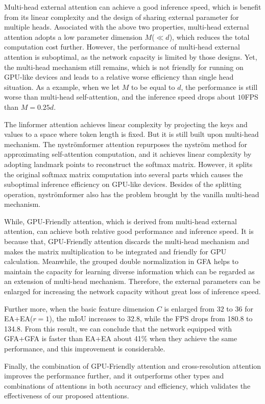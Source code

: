 \documentclass{article}
\begin{document}
Multi-head external attention can achieve a good inference speed, which is benefit from its linear complexity and the design of sharing external parameter for multiple heads. Associated with the above two properties, multi-head external attention adopts a low parameter dimension $M$($\ll d$), which reduces the total computation cost further. However, the performance of multi-head external attention is suboptimal, as the network capacity is limited by those designs. Yet, the multi-head mechanism still remains, which is not friendly for running on GPU-like devices and leads to a relative worse efficiency than single head situation. As a example, when we let $M$ to be equal to $d$, the performance is still worse than multi-head self-attention, and the inference speed drops about $10$FPS than $M = 0.25d$.

The linformer attention achieves linear complexity by projecting the keys and values to a space where token length is fixed. But it is still built upon multi-head mechanism. The nystr{\"o}mformer attention repurposes the nystr{\"o}m method for approximating self-attention computation, and it achieves linear complexity by adopting landmark points to reconstruct the softmax matrix. However, it splits the original softmax matrix computation into several parts which causes the suboptimal inference efficiency on GPU-like devices. Besides of the splitting operation, nystr{\"o}mformer also has the problem brought by the vanilla multi-head mechanism.

While, GPU-Friendly attention, which is derived from multi-head external attention, can achieve both relative good performance and inference speed. It is because that, GPU-Friendly attention discards the multi-head mechanism and makes the matrix multiplication to be integrated and friendly for GPU calculation. Meanwhile, the grouped double normalization in GFA helps to maintain the capacity for learning diverse information which can be regarded as an extension of multi-head mechanism. Therefore, the external parameters can be enlarged for increasing the network capacity without great loss of inference speed.

Further more, when the basic feature dimension $C$ is enlarged from $32$ to $36$ for EA+EA($r=1$), the mIoU increases to 32.8, while the FPS drops from 180.8 to 134.8. From this result, we can conclude that the network equipped with GFA+GFA is faster than EA+EA about 41\% when they achieve the same performance, and this improvement is considerable.

Finally, the combination of GPU-Friendly attention and cross-resolution attention improves the performance further, and it outperforms other types and combinations of attentions in both accuracy and efficiency, which validates the effectiveness of our proposed attentions.
\end{document}
